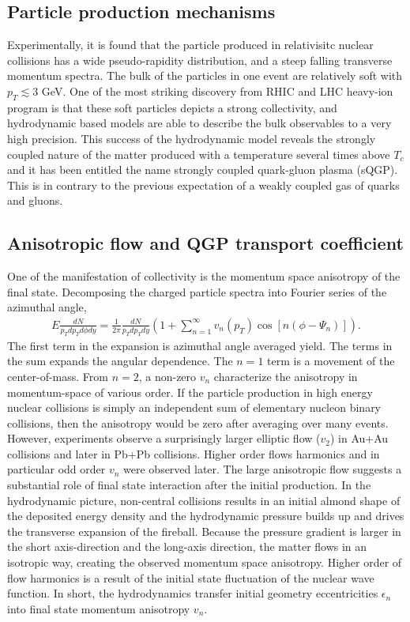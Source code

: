 \subsection{Particle production mechanisms}
Experimentally, it is found that the particle produced in relativisitc nuclear collisions has a wide pseudo-rapidity distribution, and a steep falling transverse momentum spectra.
The bulk of the particles in one event are relatively soft with $p_T \lesssim 3$ GeV.
One of the most striking discovery from RHIC and LHC heavy-ion program is that these soft particles depicts a strong collectivity, and hydrodynamic based models are able to describe the bulk observables to a very high precision.
This success of the hydrodynamic model reveals the strongly coupled nature of the matter produced with a temperature several times above $T_c$ and it has been entitled the name strongly coupled quark-gluon plasma (sQGP).
This is in contrary to the previous expectation of a weakly coupled gas of quarks and gluons.

\subsection{Anisotropic flow and QGP transport coefficient} 
One of the manifestation of collectivity is the momentum space anisotropy of the final state. 
Decomposing the charged particle spectra into Fourier series of the azimuthal angle,
\begin{eqnarray}
E\frac{dN}{p_T dp_T d\phi dy} = \frac{1}{2\pi}\frac{dN}{p_T dp_T dy}\left(1 + \sum_{n=1}^{\infty}v_n(p_T)\cos\left[n(\phi-\Psi_n)\right]\right).
\end{eqnarray}
The first term in the expansion is azimuthal angle averaged yield.
The terms in the sum expands the angular dependence. 
The $n=1$ term is a movement of the center-of-mass.
From $n=2$, a non-zero $v_n$ characterize the anisotropy in momentum-space of various order.
If the particle production in high energy nuclear collisions is simply an independent sum of elementary nucleon binary collisions, then the anisotropy would be zero after averaging over many events. 
However, experiments observe a surprisingly larger elliptic flow ($v_2$) in Au+Au collisions and later in Pb+Pb collisions.
Higher order flows harmonics and in particular odd order $v_n$ were observed later.
The large anisotropic flow suggests a substantial role of final state interaction after the initial production.
In the hydrodynamic picture, non-central collisions results in an initial almond shape of the deposited energy density and the hydrodynamic pressure builds up and drives the transverse expansion of the fireball.
Because the pressure gradient is larger in the short axis-direction and the long-axis direction, the matter flows in an isotropic way, creating the observed momentum space anisotropy.
Higher order of flow harmonics is a result of the initial state fluctuation of the nuclear wave function.
In short, the hydrodynamics transfer initial geometry eccentricities $\epsilon_n$ into final state momentum anisotropy $v_n$.

